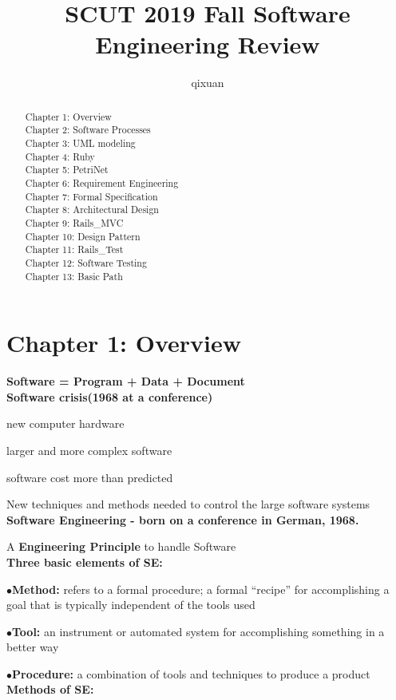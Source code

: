 \documentclass[]{report}
\title{SCUT 2019 Fall Software Engineering Review}
\author{qixuan}
\begin{document}
\maketitle

\begin{abstract}
	Chapter 1: Overview\\
	Chapter 2: Software Processes\\
	Chapter 3: UML modeling\\
	Chapter 4: Ruby\\
	Chapter 5: PetriNet\\
	Chapter 6: Requirement Engineering\\
	Chapter 7: Formal Specification\\
	Chapter 8: Architectural Design\\
	Chapter 9: Rails\_MVC\\
	Chapter 10: Design Pattern\\
	Chapter 11: Rails\_Test\\
	Chapter 12: Software Testing\\
	Chapter 13: Basic Path\\
\end{abstract}

\section*{Chapter 1: Overview}
\textbf{Software = Program + Data + Document}\\
\textbf{Software crisis(1968 at a conference)}

new computer hardware

larger and more complex software

software cost more than predicted

New techniques and methods needed to control the large software systems\\
\textbf{Software Engineering - born on a conference in German, 1968.}

A \textbf{Engineering Principle} to handle Software\\
\textbf{Three basic elements of SE: }

$\bullet$\textbf{Method: }refers to a formal procedure; a formal “recipe” for accomplishing a goal that is typically independent of the tools used

$\bullet$\textbf{Tool: }an instrument or automated system for accomplishing something in a better way

$\bullet$\textbf{Procedure: }a combination of tools and techniques to produce a product\\
\textbf{Methods of SE: }
\end{document}
